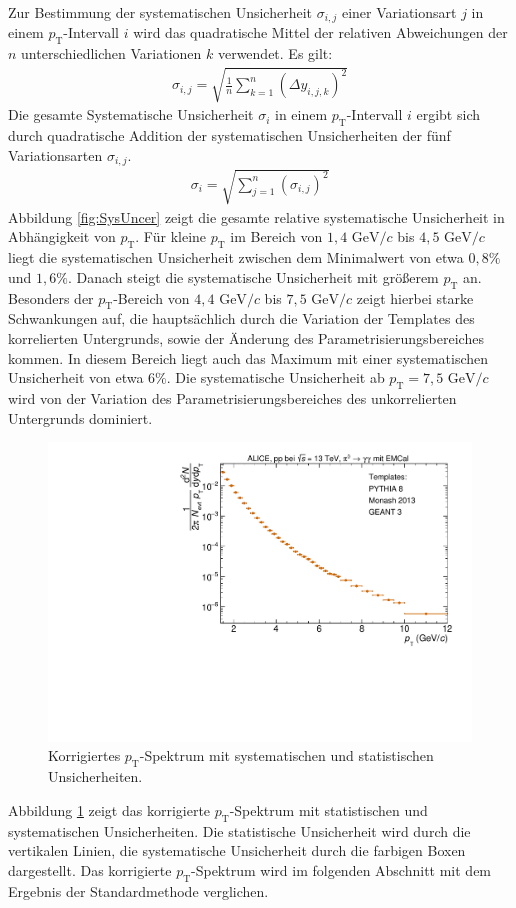 Zur Bestimmung der systematischen Unsicherheit $\sigma_{i,j}$ einer Variationsart $j$ in einem $p_\text{T}$-Intervall $i$ wird das quadratische Mittel der relativen Abweichungen der $n$ unterschiedlichen Variationen $k$ verwendet.
Es gilt:
\begin{align}
\sigma_{i,j} = \sqrt{\frac{1}{n}\sum_{k=1}^{n}\left(\Delta y_{i,j,k}\right)^{2}}
\end{align}
Die gesamte Systematische Unsicherheit $\sigma_{i}$ in einem $p_\text{T}$-Intervall $i$ ergibt sich durch quadratische Addition der systematischen Unsicherheiten der fünf Variationsarten $\sigma_{i,j}$.
\begin{align}
\sigma_{i} = \sqrt{\sum_{j=1}^{n}\left(\sigma_{i,j}\right)^{2}}
\end{align}
Abbildung \ref{fig:SysUncer} zeigt die gesamte relative systematische Unsicherheit in Abhängigkeit von $p_\text{T}$.
Für kleine $p_\text{T}$ im Bereich von $1,4 \text{ GeV}/c$ bis $4,5 \text{ GeV}/c$ liegt die systematischen Unsicherheit zwischen dem Minimalwert von etwa $0,8\%$ und $1,6\%$.
Danach steigt die systematische Unsicherheit mit größerem $p_\text{T}$ an.
Besonders der $p_\text{T}$-Bereich von $4,4 \text{ GeV}/c$ bis $7,5 \text{ GeV}/c$ zeigt hierbei starke Schwankungen auf, die hauptsächlich durch die Variation der Templates des korrelierten Untergrunds, sowie der Änderung des Parametrisierungsbereiches kommen.
In diesem Bereich liegt auch das Maximum mit einer systematischen Unsicherheit von etwa $6\%$.
Die systematische Unsicherheit ab $p_\text{T} = 7,5 \text{ GeV}/c$ wird von der Variation des Parametrisierungsbereiches des unkorrelierten Untergrunds dominiert.
\begin{figure}[t!]
\centering
\includegraphics[width=.65\linewidth]{KorrigierterYield_Data_2016.pdf}
\caption{Korrigiertes $p_\text{T}$-Spektrum mit systematischen und statistischen Unsicherheiten.}
\label{fig:KorrYield}
\end{figure}
\newline
Abbildung \ref{fig:KorrYield} zeigt das korrigierte $p_\text{T}$-Spektrum mit statistischen und systematischen Unsicherheiten.
Die statistische Unsicherheit wird durch die vertikalen Linien, die systematische Unsicherheit durch die farbigen Boxen dargestellt.
\newline
Das korrigierte $p_\text{T}$-Spektrum wird im folgenden Abschnitt mit dem Ergebnis der Standardmethode verglichen.